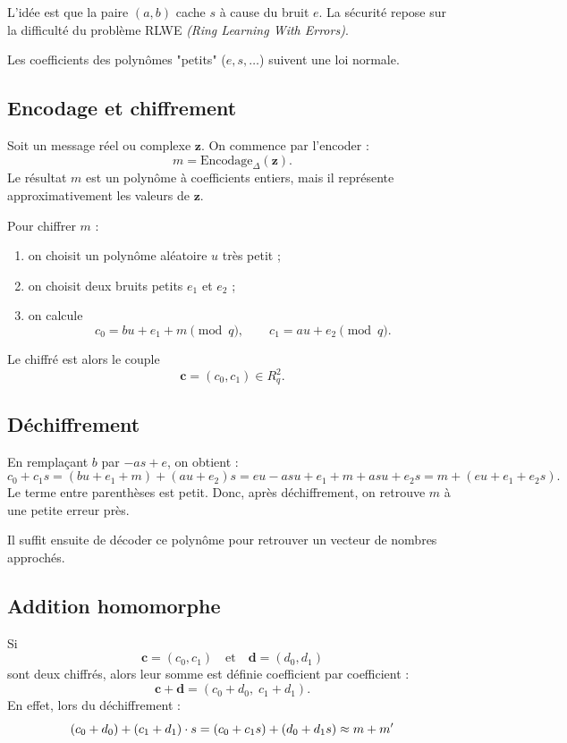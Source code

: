 L'idée est que la paire $(a,b)$ cache $s$ à cause du bruit $e$. La sécurité repose sur la difficulté du problème RLWE \emph{(Ring Learning With Errors)}.

\begin{remark}
    Les coefficients des polynômes "petits" ($e, s, \dots$) suivent une loi normale.
\end{remark}

\subsection{Encodage et chiffrement}

Soit un message réel ou complexe $\mathbf{z}$. On commence par l'encoder :
\[
m=\mathrm{Encodage}_\Delta(\mathbf{z}).
\]
Le résultat $m$ est un polynôme à coefficients entiers, mais il représente approximativement les valeurs de $\mathbf{z}$.

Pour chiffrer $m$ :

\begin{enumerate}[leftmargin=2em]
  \item on choisit un polynôme aléatoire $u$ très petit ;
  \item on choisit deux bruits petits $e_1$ et $e_2$ ;
  \item on calcule
  \[
  c_0 = b u + e_1 + m \pmod q,\qquad
  c_1 = a u + e_2 \pmod q.
  \]
\end{enumerate}

Le chiffré est alors le couple
\[
\mathbf{c}=(c_0,c_1)\in R_q^2.
\]

\subsection{Déchiffrement}

En remplaçant $b$ par $-as+e$, on obtient :
\[
c_0 + c_1 s
=
(bu+e_1+m) + (au+e_2)s
=
eu - asu + e_1 + m + asu + e_2s
=
m + (e u + e_1 + e_2 s).
\]
Le terme entre parenthèses est petit. Donc, après déchiffrement, on retrouve $m$ à une petite erreur près.

Il suffit ensuite de décoder ce polynôme pour retrouver un vecteur de nombres approchés.

\subsection{Addition homomorphe}

Si
\[
\mathbf{c}=(c_0,c_1)
\quad\text{et}\quad
\mathbf{d}=(d_0,d_1)
\]
sont deux chiffrés, alors leur somme est définie coefficient par coefficient :
\[
\mathbf{c}+\mathbf{d}=(c_0+d_0,\; c_1+d_1).
\]
En effet, lors du déchiffrement : 
\[
(c_0 + d_0) + (c_1 + d_1) \cdot s
  = (c_0 + c_1 s) + (d_0 + d_1 s) \\
  \approx m + m'
\]

